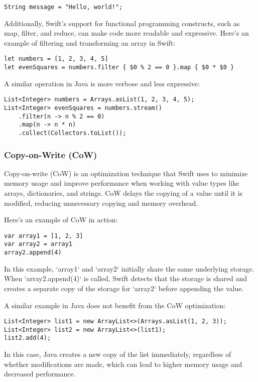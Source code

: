 \begin{verbatim}
String message = "Hello, world!";
\end{verbatim}

Additionally, Swift's support for functional programming constructs, such as map, filter, and reduce, can make code more readable and expressive. Here's an example of filtering and transforming an array in Swift:

\begin{verbatim}
let numbers = [1, 2, 3, 4, 5]
let evenSquares = numbers.filter { $0 % 2 == 0 }.map { $0 * $0 }
\end{verbatim}

A similar operation in Java is more verbose and less expressive:

\begin{verbatim}
List<Integer> numbers = Arrays.asList(1, 2, 3, 4, 5);
List<Integer> evenSquares = numbers.stream()
    .filter(n -> n % 2 == 0)
    .map(n -> n * n)
    .collect(Collectors.toList());
\end{verbatim}
\subsubsection{Copy-on-Write (CoW)}
Copy-on-write (CoW) is an optimization technique that Swift uses to minimize memory usage and improve performance when working with value types like arrays, dictionaries, and strings. CoW delays the copying of a value until it is modified, reducing unnecessary copying and memory overhead.

Here's an example of CoW in action:

\begin{verbatim}
var array1 = [1, 2, 3]
var array2 = array1
array2.append(4)
\end{verbatim}

In this example, `array1` and `array2` initially share the same underlying storage. When `array2.append(4)` is called, Swift detects that the storage is shared and creates a separate copy of the storage for `array2` before appending the value.

A similar example in Java does not benefit from the CoW optimization:

\begin{verbatim}
List<Integer> list1 = new ArrayList<>(Arrays.asList(1, 2, 3));
List<Integer> list2 = new ArrayList<>(list1);
list2.add(4);
\end{verbatim}

In this case, Java creates a new copy of the list immediately, regardless of whether modifications are made, which can lead to higher memory usage and decreased performance.

